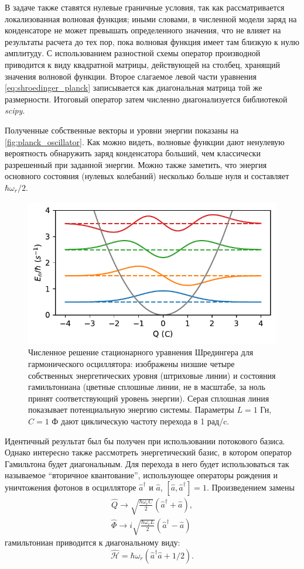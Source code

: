 \documentclass[14pt, a4paper]{extreport}
\numberwithin{equation}{section}
\begin{document}
В задаче также ставятся нулевые граничные условия, так как рассматривается локализованная волновая функция; иными словами, в численной модели заряд на конденсаторе не может превышать определенного значения, что не влияет на результаты расчета до тех пор, пока волновая функция имеет там близкую к нулю амплитуду. С использованием разностной схемы оператор производной приводится к виду квадратной матрицы, действующей на столбец, хранящий значения волновой функции. Второе слагаемое левой части уравнения \eqref{eq:shroedinger_planck} записывается как диагональная матрица той же размерности. Итоговый оператор затем численно диагонализуется библиотекой \textit{scipy}.

Полученные собственные векторы и уровни энергии показаны на \autoref{fig:planck_oscillator}. Как можно видеть, волновые функции дают ненулевую вероятность обнаружить заряд конденсатора больший, чем классически разрешенный при заданной энергии. Можно также заметить, что энергия основного состояния (нулевых колебаний) несколько больше нуля и составляет $\hbar \omega_r/2$.


\begin{figure}
	\centering
	\includegraphics[width=.6\linewidth]{planck_oscillator}
	\caption{Численное решение стационарного уравнения Шредингера для гармонического осциллятора: изображены низшие четыре собственных энергетических уровня (штриховые линии) и состояния гамильтониана (цветные сплошные линии, не в масштабе, за ноль принят соответствующий уровень энергии). Серая сплошная линия показывает потенциальную энергию системы. Параметры $L = 1$ Гн, $ C = 1$ Ф дают циклическую частоту перехода в 1 рад/c.}
	\label{fig:planck_oscillator}
\end{figure}


Идентичный результат был бы получен при использовании потокового базиса. Однако интересно также рассмотреть энергетический базис, в котором оператор Гамильтона будет диагональным. Для перехода в него будет использоваться так называемое ``вторичное квантование'', использующее операторы рождения и уничтожения фотонов в осцилляторе $\hat a^\dag$ и $\hat a$, $[\hat a, \hat a^\dag] = 1$. Произведением замены 
\begin{align}
	\hat Q \rightarrow \sqrt{\frac{\hbar \omega_r C}{2}}(\hat a^\dag + \hat a),\\
	\hat \Phi \rightarrow i\sqrt{\frac{\hbar \omega_r L}{2}}(\hat a^\dag - \hat a)
\end{align}
гамильтониан приводится к диагональному виду:
\begin{equation}
	\hat{\mathcal H} =  \hbar \omega_r (\hat a^\dag \hat a + 1/2).
\end{equation}
\end{document}
